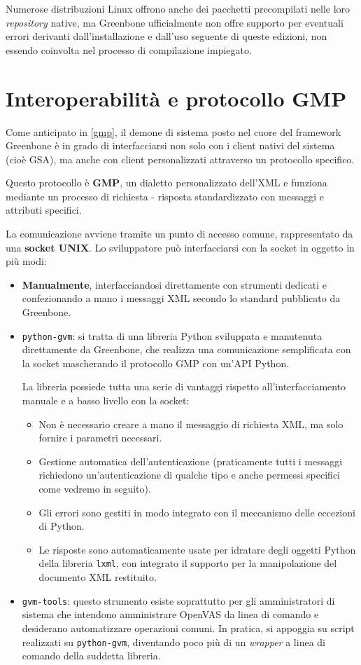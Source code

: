 Numerose distribuzioni Linux offrono anche dei pacchetti precompilati nelle loro \emph{repository} native, ma Greenbone ufficialmente non offre supporto per eventuali errori derivanti dall'installazione e dall'uso seguente di queste edizioni, non essendo coinvolta nel processo di compilazione impiegato.

\section{Interoperabilità e protocollo GMP}
\label{libraries}
Come anticipato in \ref{gmp}, il demone di sistema posto nel cuore del framework Greenbone è in grado di interfacciarsi non solo con i client nativi del sistema (cioè GSA), ma anche con client personalizzati attraverso un protocollo specifico.

Questo protocollo è \textbf{GMP}, un dialetto personalizzato dell'XML e funziona mediante un processo di richiesta - risposta standardizzato con messaggi e attributi specifici.

La comunicazione avviene tramite un punto di accesso comune, rappresentato da una \textbf{socket UNIX}. Lo sviluppatore può interfacciarsi con la socket in oggetto in più modi:
\begin{itemize}
    \item \textbf{Manualmente}, interfacciandosi direttamente con strumenti dedicati e confezionando a mano i messaggi XML secondo lo standard pubblicato da Greenbone.
    \item \texttt{python-gvm}: si tratta di una libreria Python sviluppata e manutenuta direttamente da Greenbone, che realizza una comunicazione semplificata con la socket mascherando il protocollo GMP con un'API Python.
    
    La libreria possiede tutta una serie di vantaggi rispetto all'interfacciamento manuale e a basso livello con la socket:
    \begin{itemize}
        \item Non è necessario creare a mano il messaggio di richiesta XML, ma solo fornire i parametri necessari.
        \item Gestione automatica dell'autenticazione (praticamente tutti i messaggi richiedono un'autenticazione di qualche tipo e anche permessi specifici come vedremo in seguito).
        \item Gli errori sono gestiti in modo integrato con il meccanismo delle eccezioni di Python.
        \item Le risposte sono automaticamente usate per idratare degli oggetti Python della libreria \texttt{lxml}, con integrato il supporto per la manipolazione del documento XML restituito.
    \end{itemize}
    \item \texttt{gvm-tools}: questo strumento esiste soprattutto per gli amministratori di sistema che intendono amministrare OpenVAS da linea di comando e desiderano automatizzare operazioni comuni. In pratica, si appoggia su script realizzati su \texttt{python-gvm}, diventando poco più di un \emph{wrapper} a linea di comando della suddetta libreria.
\end{itemize}

